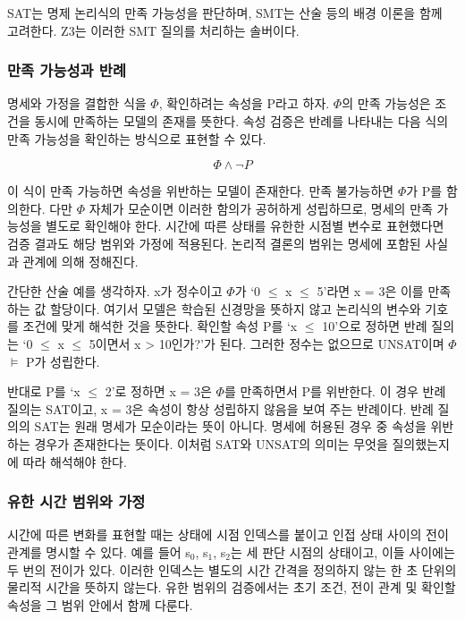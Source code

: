 \documentclass[10pt,a4paper,twocolumn]{article}\usepackage[margin=18mm]{geometry}\usepackage{fontspec,kotex}
\begin{document}
SAT는 명제 논리식의 만족 가능성을 판단하며, SMT는 산술 등의 배경 이론을 함께 고려한다. \cite{r11} Z3는 이러한 SMT 질의를 처리하는 솔버이다. \cite{r12}\par

\subsubsection{만족 가능성과 반례}

명세와 가정을 결합한 식을 \ensuremath{\Phi}, 확인하려는 속성을 P라고 하자. \ensuremath{\Phi}의 만족 가능성은 조건을 동시에 만족하는 모델의 존재를 뜻한다. 속성 검증은 반례를 나타내는 다음 식의 만족 가능성을 확인하는 방식으로 표현할 수 있다.\par

\[\Phi\land\neg P\]

이 식이 만족 가능하면 속성을 위반하는 모델이 존재한다. 만족 불가능하면 \ensuremath{\Phi}가 P를 함의한다. 다만 \ensuremath{\Phi} 자체가 모순이면 이러한 함의가 공허하게 성립하므로, 명세의 만족 가능성을 별도로 확인해야 한다. 시간에 따른 상태를 유한한 시점별 변수로 표현했다면 검증 결과도 해당 범위와 가정에 적용된다. 논리적 결론의 범위는 명세에 포함된 사실과 관계에 의해 정해진다. \cite{r11}\par

간단한 산술 예를 생각하자. x가 정수이고 \ensuremath{\Phi}가 ‘0 \ensuremath{\leq} x \ensuremath{\leq} 5’라면 x = 3은 이를 만족하는 값 할당이다. 여기서 모델은 학습된 신경망을 뜻하지 않고 논리식의 변수와 기호를 조건에 맞게 해석한 것을 뜻한다. 확인할 속성 P를 ‘x \ensuremath{\leq} 10’으로 정하면 반례 질의는 ‘0 \ensuremath{\leq} x \ensuremath{\leq} 5이면서 x > 10인가?’가 된다. 그러한 정수는 없으므로 UNSAT이며 \ensuremath{\Phi} \ensuremath{\models} P가 성립한다.\par

반대로 P를 ‘x \ensuremath{\leq} 2’로 정하면 x = 3은 \ensuremath{\Phi}를 만족하면서 P를 위반한다. 이 경우 반례 질의는 SAT이고, x = 3은 속성이 항상 성립하지 않음을 보여 주는 반례이다. 반례 질의의 SAT는 원래 명세가 모순이라는 뜻이 아니다. 명세에 허용된 경우 중 속성을 위반하는 경우가 존재한다는 뜻이다. 이처럼 SAT와 UNSAT의 의미는 무엇을 질의했는지에 따라 해석해야 한다.\par

\subsubsection{유한 시간 범위와 가정}

시간에 따른 변화를 표현할 때는 상태에 시점 인덱스를 붙이고 인접 상태 사이의 전이 관계를 명시할 수 있다. 예를 들어 s\ensuremath{_0}, s\ensuremath{_1}, s\ensuremath{_2}는 세 판단 시점의 상태이고, 이들 사이에는 두 번의 전이가 있다. 이러한 인덱스는 별도의 시간 간격을 정의하지 않는 한 초 단위의 물리적 시간을 뜻하지 않는다. 유한 범위의 검증에서는 초기 조건, 전이 관계 및 확인할 속성을 그 범위 안에서 함께 다룬다.\par
\end{document}
